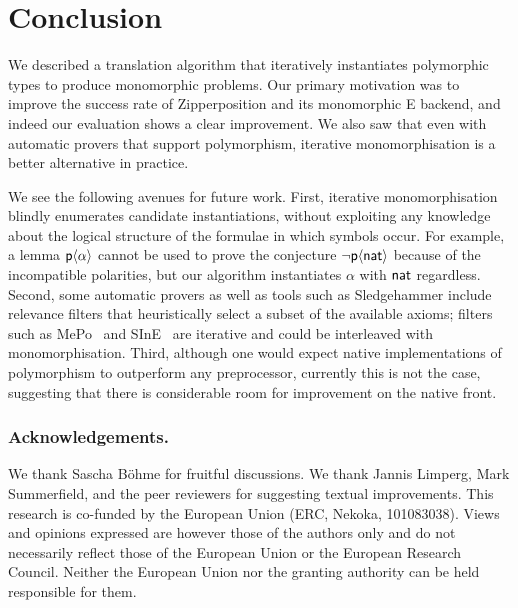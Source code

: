 \documentclass[runningheads]{llncs}
\begin{document}
\section{Conclusion}
\label{sec:conclusion}

We described a translation algorithm that iteratively instantiates polymorphic types to
produce monomorphic problems. Our primary motivation was to improve the success
rate of Zipperposition and its monomorphic E backend, and indeed our evaluation
shows a clear improvement. We also saw that even with automatic provers that
support polymorphism, iterative monomorphisation is a better alternative in
practice.

We see the following avenues for future work. First, iterative monomorphisation
blindly enumerates candidate instantiations, without exploiting any knowledge
about the logical structure of the formulae in which symbols occur. For
example, a lemma $\textsf{p}\langle\alpha\rangle$ cannot be used to prove the
conjecture $\lnot \textsf{p}\langle\textsf{nat}\rangle$ because of the incompatible
polarities, but our algorithm instantiates $\alpha$ with $\textsf{nat}$ regardless.
Second, some automatic provers as well as tools such as Sledgehammer include
relevance filters that heuristically select a subset of the available axioms;
filters such as MePo~\cite{meng-paulson-2009} and SInE~\cite{hoder-voronkov-2011} are iterative and could be interleaved with
monomorphisation. Third, although one would expect native implementations of
polymorphism to outperform any preprocessor, currently this is not the case, suggesting that there is considerable room for improvement on the native front.

\begin{credits}
   \subsubsection{Acknowledgements.}

   We thank Sascha Böhme for fruitful discussions.
   We thank Jannis Limperg, Mark Summerfield, and the peer reviewers for suggesting textual improvements.
   This research is co-funded by the European Union (ERC, Nekoka, 101083038). Views and opinions expressed are however those of the authors only and do not necessarily reflect those of the European Union or the European Research Council. Neither the European Union nor the granting authority can be held responsible for them.
\end{credits}



\end{document}
